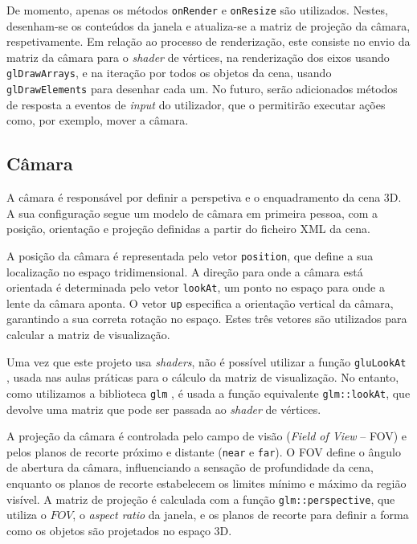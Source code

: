 \documentclass[12pt, a4paper]{article}
\begin{document}
De momento, apenas os métodos \texttt{onRender} e \texttt{onResize} são utilizados. Nestes,
desenham-se os conteúdos da janela e atualiza-se a matriz de projeção da câmara, respetivamente. Em
relação ao processo de renderização, este consiste no envio da matriz da câmara para o \emph{shader}
de vértices, na renderização dos eixos usando \texttt{glDrawArrays}, e na iteração por todos os
objetos da cena, usando \texttt{glDrawElements} para desenhar cada um. No futuro, serão adicionados
métodos de resposta a eventos de \emph{input} do utilizador, que o permitirão executar ações como,
por exemplo, mover a câmara.

\subsection{Câmara}

A câmara é responsável por definir a perspetiva e o enquadramento da cena 3D. A sua configuração
segue um modelo de câmara em primeira pessoa, com a posição, orientação e projeção definidas a
partir do ficheiro XML da cena.

A posição da câmara é representada pelo vetor \texttt{position}, que define a sua localização no
espaço tridimensional. A direção para onde a câmara está orientada é determinada pelo vetor
\texttt{lookAt}, um ponto no espaço para onde a lente da câmara aponta. O vetor \texttt{up}
especifica a orientação vertical da câmara, garantindo a sua correta rotação no espaço. Estes três
vetores são utilizados para calcular a matriz de visualização.

Uma vez que este projeto usa \emph{shaders}, não é possível utilizar a função \texttt{gluLookAt}
\cite{gluLookAt}, usada nas aulas práticas para o cálculo da matriz de visualização. No entanto,
como utilizamos a biblioteca \texttt{glm} \cite{glm}, é usada a função equivalente
\texttt{glm::lookAt}, que devolve uma matriz que pode ser passada ao \emph{shader} de vértices.

A projeção da câmara é controlada pelo campo de visão (\emph{Field of View} -- FOV) e pelos planos
de recorte próximo e distante (\texttt{near} e \texttt{far}). O FOV define o ângulo de abertura da
câmara, influenciando a sensação de profundidade da cena, enquanto os planos de recorte estabelecem
os limites mínimo e máximo da região visível. A matriz de projeção é calculada com a função
\texttt{glm::perspective}, que utiliza o $FOV$, o \emph{aspect ratio} da janela, e os planos de
recorte para definir a forma como os objetos são projetados no espaço 3D.
\end{document}
